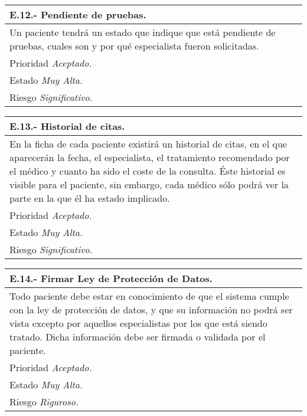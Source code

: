 	\begin{center}
	\begin{tabulary}{15cm}{|L|}
		\hline
			\bf{E.12.- Pendiente de pruebas.} \\
		\hline
			Un paciente tendrá un estado que indique que está pendiente de pruebas, cuales son y por qué especialista fueron solicitadas. \\
		\hline
			Prioridad \textit{Aceptado.} \\
		\hline
			Estado \textit{Muy Alta.} \\
		\hline
			Riesgo \textit{Significativo.} \\
		\hline
	\end{tabulary}
	\end{center}

	\begin{center}
	\begin{tabulary}{15cm}{|L|}
		\hline
			\bf{E.13.- Historial de citas.} \\
		\hline
			En la ficha de cada paciente existirá un historial de citas, en el que aparecerán la fecha, el especialista, el tratamiento recomendado por el médico y cuanto ha sido el coste de la consulta. Éste historial es visible para el paciente, sin embargo, cada médico sólo podrá ver la parte en la que él ha estado implicado. \\
		\hline
			Prioridad \textit{Aceptado.} \\
		\hline
			Estado \textit{Muy Alta.} \\
		\hline
			Riesgo \textit{Significativo.} \\
		\hline
	\end{tabulary}
	\end{center}

	\begin{center}
	\begin{tabulary}{15cm}{|L|}
		\hline
			\bf{E.14.- Firmar Ley de Protección de Datos.} \\
		\hline
			Todo paciente debe estar en conocimiento de que el sistema cumple con la ley de protección de datos, y que su información no podrá ser vista excepto por aquellos especialistas por los que está siendo tratado. Dicha información debe ser firmada o validada por el paciente. \\
		\hline
			Prioridad \textit{Aceptado.} \\
		\hline
			Estado \textit{Muy Alta.} \\
		\hline
			Riesgo \textit{Riguroso.} \\
		\hline
	\end{tabulary}
	\end{center}

